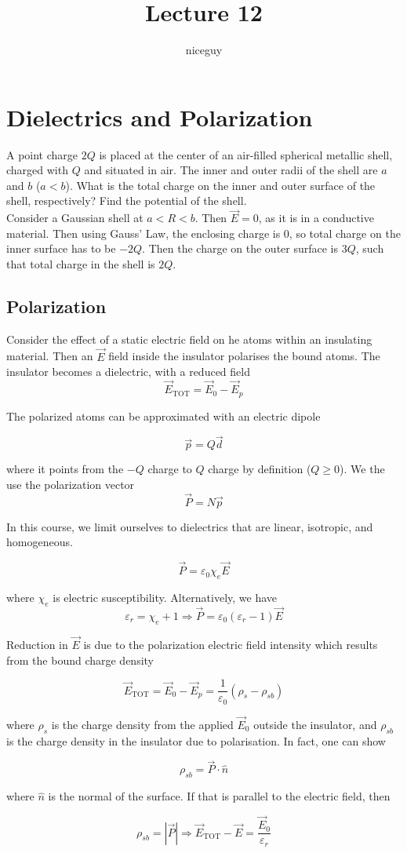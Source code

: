 \documentclass[12pt]{article}
\author{niceguy}
\title{Lecture 12}
\begin{document}
\maketitle

\section{Dielectrics and Polarization}

\begin{ex}
	A point charge $2Q$ is placed at the center of an air-filled spherical metallic shell, charged with $Q$ and situated in air. The inner and outer radii of the shell are $a$ and $b$ ($a<b$). What is the total charge on the inner and outer surface of the shell, respectively? Find the potential of the shell. \\
	Consider a Gaussian shell at $a < R < b$. Then $\vec{E} = 0$, as it is in a conductive material. Then using Gauss' Law, the enclosing charge is 0, so total charge on the inner surface has to be $-2Q$. Then the charge on the outer surface is $3Q$, such that total charge in the shell is $2Q$.
\end{ex}

\subsection{Polarization}

Consider the effect of a static electric field on he atoms within an insulating material. Then an $\vec{E}$ field inside the insulator polarises the bound atoms. The insulator becomes a dielectric, with a reduced field
$$\vec{E}_{\text{TOT}} = \vec{E}_0 - \vec{E}_p$$

The polarized atoms can be approximated with an electric dipole

$$\vec{p} = Q\vec{d}$$

where it points from the $-Q$ charge to $Q$ charge by definition ($Q\geq0$). We the use the polarization vector
$$\vec{P} = N\vec{p}$$

In this course, we limit ourselves to dielectrics that are linear, isotropic, and homogeneous.

$$\vec{P} = \varepsilon_0 \chi_e \vec{E}$$

where $\chi_e$ is electric susceptibility. Alternatively, we have
$$\varepsilon_r = \chi_e + 1 \Rightarrow \vec{P} = \varepsilon_0(\varepsilon_r - 1)\vec{E}$$

Reduction in $\vec{E}$ is due to the polarization electric field intensity which results from the bound charge density

$$\vec{E}_{\text{TOT}} = \vec{E}_0 - \vec{E}_p = \frac{1}{\varepsilon_0} (\rho_s - \rho_{sb})$$

where $\rho_s$ is the charge density from the applied $\vec{E}_0$ outside the insulator, and $\rho_{sb}$ is the charge density in the insulator due to polarisation. In fact, one can show

$$\rho_{sb} = \vec{P}\cdot\hat{n}$$

where $\hat{n}$ is the normal of the surface. If that is parallel to the electric field, then

$$\rho_{sb} = |\vec{P}| \Rightarrow \vec{E}_{\text{TOT}} - \vec{E} = \frac{\vec{E}_0}{\varepsilon_r}$$
\end{document}
